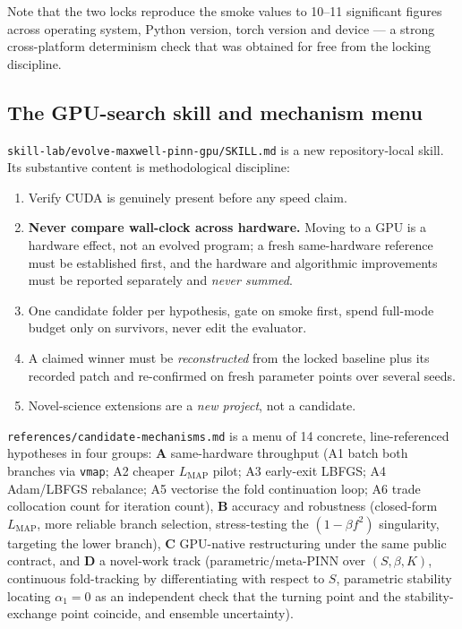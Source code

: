 \documentclass[11pt,a4paper]{article}
\newcommand{\code}[1]{\texttt{\small #1}}
\begin{document}
\noindent Note that the two locks reproduce the smoke values to 10--11 significant figures
across operating system, Python version, torch version and device --- a strong
cross-platform determinism check that was obtained for free from the locking discipline.

\subsection{The GPU-search skill and mechanism menu}
\code{skill-lab/evolve-maxwell-pinn-gpu/SKILL.md} is a new repository-local skill. Its
substantive content is methodological discipline:
\begin{enumerate}[leftmargin=1.4em,itemsep=1pt]
  \item Verify CUDA is genuinely present before any speed claim.
  \item \textbf{Never compare wall-clock across hardware.} Moving to a GPU is a hardware
        effect, not an evolved program; a fresh same-hardware reference must be established
        first, and the hardware and algorithmic improvements must be reported separately
        and \emph{never summed}.
  \item One candidate folder per hypothesis, gate on smoke first, spend full-mode budget
        only on survivors, never edit the evaluator.
  \item A claimed winner must be \emph{reconstructed} from the locked baseline plus its
        recorded patch and re-confirmed on fresh parameter points over several seeds.
  \item Novel-science extensions are a \emph{new project}, not a candidate.
\end{enumerate}
\code{references/candidate-mechanisms.md} is a menu of 14 concrete, line-referenced
hypotheses in four groups: \textbf{A} same-hardware throughput (A1 batch both branches via
\code{vmap}; A2 cheaper $L_{\mathrm{MAP}}$ pilot; A3 early-exit LBFGS; A4 Adam/LBFGS
rebalance; A5 vectorise the fold continuation loop; A6 trade collocation count for
iteration count), \textbf{B} accuracy and robustness (closed-form $L_{\mathrm{MAP}}$, more
reliable branch selection, stress-testing the $(1-\beta f^2)$ singularity, targeting the
lower branch), \textbf{C} GPU-native restructuring under the same public contract, and
\textbf{D} a novel-work track (parametric/meta-PINN over $(S,\beta,K)$, continuous
fold-tracking by differentiating with respect to $S$, parametric stability locating
$\alpha_1=0$ as an independent check that the turning point and the stability-exchange
point coincide, and ensemble uncertainty).
\end{document}
